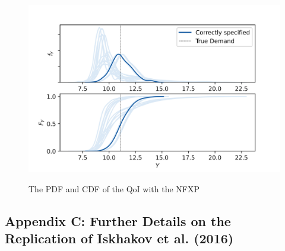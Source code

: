 \begin{figure}[H]
	\caption{The PDF and CDF of the QoI with the NFXP}
	\vspace*{-4mm}
	\centering
	\includegraphics[scale=0.9]{../figures/figure_13.png}
	\label{figure13}
\end{figure}


\newpage
\subsection{Appendix C: Further Details on the Replication of Iskhakov et al. (2016)} \label{appendixC}

